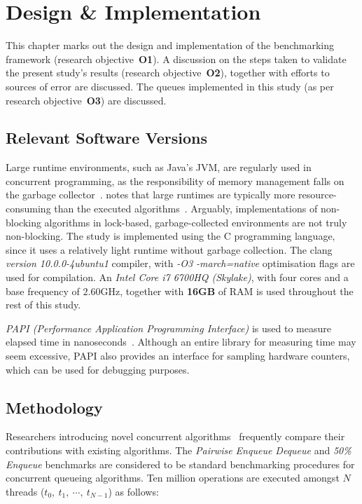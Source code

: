 \chapter{Design \& Implementation}
This chapter marks out the design and implementation of the benchmarking
framework (research objective~\textbf{O1}). A discussion on the steps taken to validate the
present study's results (research objective~\textbf{O2}), together
with efforts to sources of error are discussed. The queues implemented in this
study (as per research objective~\textbf{O3}) are discussed.

\section{Relevant Software Versions}
Large runtime environments, such as Java's JVM, are regularly used in
concurrent programming, as the responsibility of memory management falls on the
garbage collector~\citep{kogan2011wait}. \citeauthor{fog2020optimizing} notes
that large runtimes are typically more resource-consuming than the executed
algorithms~\citep{fog2020optimizing}. Arguably, implementations of non-blocking
algorithms in lock-based, garbage-collected environments are not truly
non-blocking. The study is implemented using the C programming language, since
it uses a relatively light runtime without garbage collection. The clang
\emph{version 10.0.0-4ubuntu1} compiler, with \emph{-O3 -march=native}
optimisation flags are used for compilation. An \emph{Intel Core i7 6700HQ
(Skylake)}, with four cores and a base frequency of $2.60\text{GHz}$, together
with \textbf{16GB} of RAM is used throughout the rest of this study.

\emph{PAPI (Performance Application Programming Interface)} is used to measure
elapsed time in nanoseconds~\citep{terpstra2010papi}. Although an entire library for measuring time 
may seem excessive, PAPI also provides an interface for
sampling hardware counters, which can be used for debugging purposes.

\section{Methodology\label{sec:design_and_implementation_methodology}}

Researchers introducing novel concurrent
algorithms~\citep{michael1996simple,valois1994queues,kogan2011wait,hoffman2007baskets,yang2016wait}
frequently compare their contributions with existing algorithms. The
\emph{Pairwise Enqueue Dequeue} and \emph{50\% Enqueue}
benchmarks are considered to be standard benchmarking procedures for concurrent
queueing algorithms. Ten million operations are
executed amongst $N$ threads ($t_0,~t_1,~\cdots,~t_{N-1}$) as follows: 

